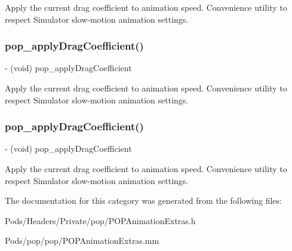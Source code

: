 Apply the current drag coefficient to animation speed.  Convenience utility to respect Simulator slow-\/motion animation settings. \mbox{\label{category_c_a_animation_07_p_o_p_animation_extras_08_aa7e4f22d1c895222080a430d9b4159fc}} 
\subsubsection{\texorpdfstring{pop\+\_\+apply\+Drag\+Coefficient()}{pop\_applyDragCoefficient()}\hspace{0.1cm}{\footnotesize\ttfamily [2/3]}}
{\footnotesize\ttfamily -\/ (void) pop\+\_\+apply\+Drag\+Coefficient \begin{DoxyParamCaption}{ }\end{DoxyParamCaption}}

Apply the current drag coefficient to animation speed.  Convenience utility to respect Simulator slow-\/motion animation settings. \mbox{\label{category_c_a_animation_07_p_o_p_animation_extras_08_aa7e4f22d1c895222080a430d9b4159fc}} 
\subsubsection{\texorpdfstring{pop\+\_\+apply\+Drag\+Coefficient()}{pop\_applyDragCoefficient()}\hspace{0.1cm}{\footnotesize\ttfamily [3/3]}}
{\footnotesize\ttfamily -\/ (void) pop\+\_\+apply\+Drag\+Coefficient \begin{DoxyParamCaption}{ }\end{DoxyParamCaption}}

Apply the current drag coefficient to animation speed.  Convenience utility to respect Simulator slow-\/motion animation settings. 

The documentation for this category was generated from the following files\+:\begin{DoxyCompactItemize}
\item 
Pods/\+Headers/\+Private/pop/P\+O\+P\+Animation\+Extras.\+h\item 
Pods/pop/pop/P\+O\+P\+Animation\+Extras.\+mm\end{DoxyCompactItemize}
